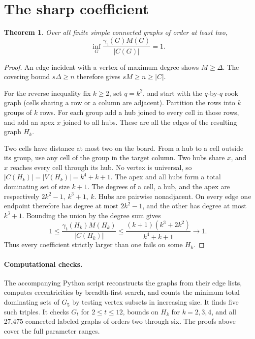 \documentclass[10pt]{article}
\newtheorem{theorem}{Theorem}
\newcommand{\gtot}{\gamma_{\mathrm t}}
\begin{document}
\section{The sharp coefficient}
\begin{theorem}
Over all finite simple connected graphs of order at least two,
\[
 \inf_G\frac{\gtot(G)M(G)}{|C(G)|}=1.
\]
\end{theorem}
\begin{proof}
An edge incident with a vertex of maximum degree shows \(M\ge\Delta\).
The covering bound \(s\Delta\ge n\) therefore gives \(sM\ge n\ge|C|\).

For the reverse inequality fix \(k\ge2\), set \(q=k^2\), and start with
the \(q\)-by-\(q\) rook graph (cells sharing a row or a column are adjacent).
Partition the rows into \(k\) groups of \(k\) rows. For each group add a
hub joined to every cell in those rows, and add an apex \(x\) joined to
all hubs. These are all the edges of the resulting graph \(H_k\).

Two cells have distance at most two on the board. From a hub to a cell
outside its group, use any cell of the group in the target column.
Two hubs share \(x\), and \(x\) reaches every cell through its hub.
No vertex is universal, so \(|C(H_k)|=|V(H_k)|=k^4+k+1\).
The apex and all hubs form a total dominating set of size \(k+1\).
The degrees of a cell, a hub, and the apex are respectively
\(2k^2-1,\ k^3+1,\ k\). Hubs are pairwise nonadjacent. On every edge
one endpoint therefore has degree at most \(2k^2-1\), and the other
has degree at most \(k^3+1\). Bounding the union by the degree sum gives
\[
 1\le\frac{\gtot(H_k)M(H_k)}{|C(H_k)|}
 \le\frac{(k+1)(k^3+2k^2)}{k^4+k+1}\longrightarrow 1 .
\]
Thus every coefficient strictly larger than one fails on some \(H_k\).
\end{proof}

\paragraph{Computational checks.}
The accompanying Python script reconstructs the graphs from their edge
lists, computes eccentricities by breadth-first search, and counts the
minimum total dominating sets of \(G_5\) by testing vertex subsets in
increasing size. It finds five such triples. It checks \(G_t\) for
\(2\le t\le12\), bounds on \(H_k\) for \(k=2,3,4\), and all 27,475
connected labeled graphs of orders two through six. The proofs above cover
the full parameter ranges.
\end{document}
